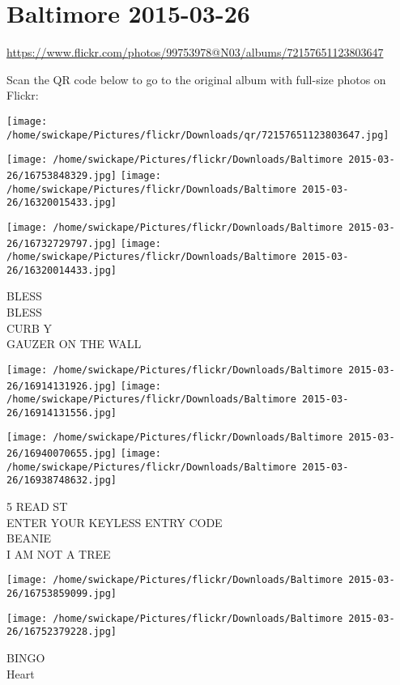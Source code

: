 \documentclass[10pt,letterpaper]{article}
\title{}
\author{}
\date{}
\begin{document}
\section*{Baltimore 2015-03-26}

\url{https://www.flickr.com/photos/99753978@N03/albums/72157651123803647}

Scan the QR code below to go to the original album with full-size photos on Flickr:

\texttt{[image: /home/swickape/Pictures/flickr/Downloads/qr/72157651123803647.jpg]}
\pagebreak

\texttt{[image: /home/swickape/Pictures/flickr/Downloads/Baltimore 2015-03-26/16753848329.jpg]}
\texttt{[image: /home/swickape/Pictures/flickr/Downloads/Baltimore 2015-03-26/16320015433.jpg]}

\texttt{[image: /home/swickape/Pictures/flickr/Downloads/Baltimore 2015-03-26/16732729797.jpg]}
\texttt{[image: /home/swickape/Pictures/flickr/Downloads/Baltimore 2015-03-26/16320014433.jpg]}

BLESS\\
BLESS\\
CURB Y\\
GAUZER ON THE WALL
\pagebreak

\texttt{[image: /home/swickape/Pictures/flickr/Downloads/Baltimore 2015-03-26/16914131926.jpg]}
\texttt{[image: /home/swickape/Pictures/flickr/Downloads/Baltimore 2015-03-26/16914131556.jpg]}

\texttt{[image: /home/swickape/Pictures/flickr/Downloads/Baltimore 2015-03-26/16940070655.jpg]}
\texttt{[image: /home/swickape/Pictures/flickr/Downloads/Baltimore 2015-03-26/16938748632.jpg]}

5 READ ST\\
ENTER YOUR KEYLESS ENTRY CODE\\
BEANIE\\
I AM NOT A TREE
\pagebreak

\texttt{[image: /home/swickape/Pictures/flickr/Downloads/Baltimore 2015-03-26/16753859099.jpg]}

\vspace{0.25in}
\texttt{[image: /home/swickape/Pictures/flickr/Downloads/Baltimore 2015-03-26/16752379228.jpg]}

BINGO\\
Heart
\pagebreak
\end{document}
